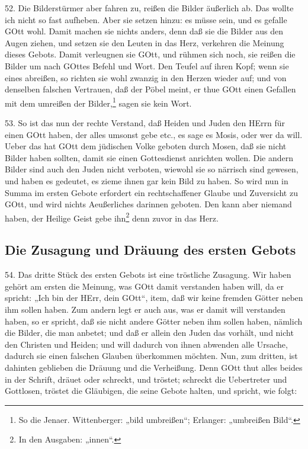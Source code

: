 52. Die Bilderstürmer aber fahren zu, reißen die Bilder äußerlich ab. Das wollte ich nicht so fast aufheben. Aber sie setzen hinzu: es müsse sein, und es gefalle GOtt wohl. Damit machen sie nichts anders, denn daß sie die Bilder aus den Augen ziehen, und setzen sie den Leuten in das Herz, verkehren die Meinung dieses Gebots. Damit verleugnen sie GOtt, und rühmen sich noch, sie reißen die Bilder um nach GOttes Befehl und Wort. Den Teufel auf ihren Kopf; wenn sie eines abreißen, so richten sie wohl zwanzig in den Herzen wieder auf; und von denselben falschen Vertrauen, daß der Pöbel meint, er thue GOtt einen Gefallen mit dem umreißen der Bilder,\footnote{So die Jenaer. Wittenberger: „bild umbreißen“; Erlanger: „umbreißen Bild“.} sagen sie kein Wort.

53. So ist das nun der rechte Verstand, daß Heiden und Juden den HErrn für einen GOtt haben, der alles umsonst gebe etc., es sage es Mosis, oder wer da will. Ueber das hat GOtt dem jüdischen Volke geboten durch Mosen, daß sie nicht Bilder haben sollten, damit sie einen Gottesdienst anrichten wollen. Die andern Bilder sind auch den Juden nicht verboten, wiewohl sie so närrisch sind gewesen, und haben es gedeutet, es zieme ihnen gar kein Bild zu haben. So wird nun in Summa im ersten Gebote erfordert ein rechtschaffener Glaube und Zuversicht zu GOtt, und wird nichts Aeußerliches darinnen geboten. Den kann aber niemand haben, der Heilige Geist gebe ihn\footnote{In den Ausgaben: „innen“.} denn zuvor in das Herz.

\subsection{Die Zusagung und Dräuung des ersten Gebots}

54. Das dritte Stück des ersten Gebots ist eine tröstliche Zusagung. Wir haben gehört am ersten die Meinung, was GOtt damit verstanden haben will, da er spricht: „Ich bin der HErr, dein GOtt“, item, daß wir keine fremden Götter neben ihm sollen haben. Zum andern legt er auch aus, was er damit will verstanden haben, so er spricht, daß sie nicht andere Götter neben ihm sollen haben, nämlich die Bilder, die man anbetet; und daß er allein den Juden das vorhält, und nicht den Christen und Heiden; und will dadurch von ihnen abwenden alle Ursache, dadurch sie einen falschen Glauben überkommen möchten. Nun, zum dritten, ist dahinten geblieben die Dräuung und die Verheißung. Denn GOtt thut alles beides in der Schrift, dräuet oder schreckt, und tröstet; schreckt die Uebertreter und Gottlosen, tröstet die Gläubigen, die seine Gebote halten, und spricht, wie folgt:


